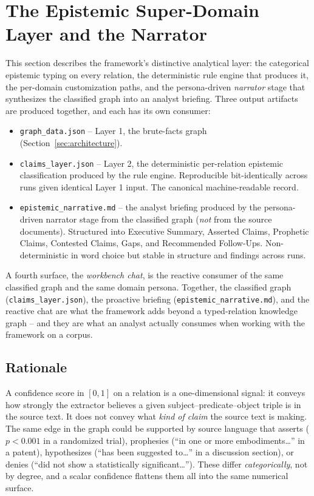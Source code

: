 \section{The Epistemic Super-Domain Layer and the Narrator}
\label{sec:epistemic}

This section describes the framework's distinctive analytical layer: the categorical epistemic typing on every relation, the deterministic rule engine that produces it, the per-domain customization paths, and the persona-driven \emph{narrator} stage that synthesizes the classified graph into an analyst briefing. Three output artifacts are produced together, and each has its own consumer:

\begin{itemize}
\item \texttt{graph\_data.json} -- Layer 1, the brute-facts graph (Section~\ref{sec:architecture}).
\item \texttt{claims\_layer.json} -- Layer 2, the deterministic per-relation epistemic classification produced by the rule engine. Reproducible bit-identically across runs given identical Layer 1 input. The canonical machine-readable record.
\item \texttt{epistemic\_narrative.md} -- the analyst briefing produced by the persona-driven narrator stage from the classified graph (\emph{not} from the source documents). Structured into Executive Summary, Asserted Claims, Prophetic Claims, Contested Claims, Gaps, and Recommended Follow-Ups. Non-deterministic in word choice but stable in structure and findings across runs.
\end{itemize}

A fourth surface, the \emph{workbench chat}, is the reactive consumer of the same classified graph and the same domain persona. Together, the classified graph (\texttt{claims\_layer.json}), the proactive briefing (\texttt{epistemic\_narrative.md}), and the reactive chat are what the framework adds beyond a typed-relation knowledge graph -- and they are what an analyst actually consumes when working with the framework on a corpus.

\subsection{Rationale}

A confidence score in $[0, 1]$ on a relation is a one-dimensional signal: it conveys how strongly the extractor believes a given subject--predicate--object triple is in the source text. It does not convey what \emph{kind of claim} the source text is making. The same edge in the graph could be supported by source language that asserts ($p<0.001$ in a randomized trial), prophesies (``in one or more embodiments\ldots'' in a patent), hypothesizes (``has been suggested to\ldots'' in a discussion section), or denies (``did not show a statistically significant\ldots''). These differ \emph{categorically}, not by degree, and a scalar confidence flattens them all into the same numerical surface.

